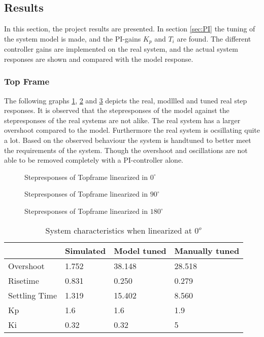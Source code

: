 \documentclass[../../Main]{subfiles}
\begin{document}
\subsection{Results}
\label{sec:results}
In this section, the project results are presented. In section \ref{sec:PI} the tuning of the system model is made, and the PI-gains $K_p$ and $T_i$ are found. The different controller gains are implemented on the real system, and the actual system responses are shown and compared
with the model response.

\subsubsection{Top Frame}
\label{sec:top_frame_results}

The following graphs \ref{fig:top_0}, \ref{fig:top_90} and \ref{fig:top_180} depicts the real, modllled and tuned real step responses.
It is observed that the stepresponses of the model against the stepresponses of the real
systems are not alike. The real system has a larger overshoot compared to the model.
Furthermore the real system is ocsillating quite a lot. Based on the observed behaviour
the system is handtuned to better meet the requirements of the system. Though the
overshoot and oscillations are not able to be removed completely with a PI-controller
alone.


\begin{figure}[H]
  \def\svgwidth{\textwidth}
  
  \caption{Stepresponses of Topframe linearized in $0^{\circ}$}
  \label{fig:top_0}
\end{figure}


\begin{figure}[H]	
  \def\svgwidth{\textwidth}
  
  \caption{Stepresponses of Topframe linearized in $90^{\circ}$}
  \label{fig:top_90}
\end{figure}

\begin{figure}[H]
  \def\svgwidth{\textwidth}
  
  \caption{Stepresponses of Topframe linearized in $180^{\circ}$}
  \label{fig:top_180}
\end{figure}



\begin{table}[H]
	\centering
	\begin{tabular}{l|*{3}{l}}
		&Simulated&Model tuned&Manually tuned\\
		\hline
		Overshoot&1.752&38.148&28.518\\
		Risetime&0.831&0.250&0.279\\
		Settling Time&1.319&15.402&8.560\\
		Kp&1.6&1.6&1.9\\
		Ki&0.32&0.32&5
	\end{tabular}
	\caption{System characteristics when linearized at $0^o$}
	\label{tab:0_top}
\end{table}
\end{document}
